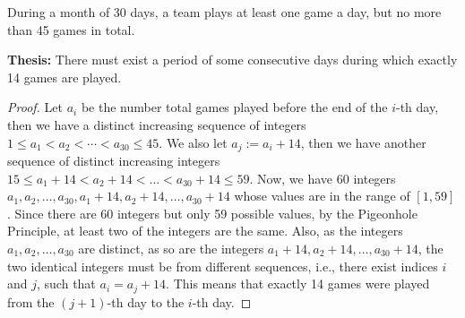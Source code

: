 \begin{example}
    During a month of 30 days, a team plays at least one game a day, but no more than 45 games in total.

    \textbf{Thesis:} There must exist a period of some consecutive days during which exactly 14 games are
    played.

    \begin{proof}
        Let $a_i$ be the number total games played before the end of the $i$-th day, then we have
        a distinct increasing sequence of integers $1\leq a_1<a_2<\cdots<a_{30}\leq 45$. We also let
        $a_j := a_i+14$, then we have another sequence of distinct increasing integers
        $15\leq a_1+14<a_2+14<\ldots<a_{30}+14\leq 59$. Now, we have 60 integers $a_1, a_2, \ldots, a_{30},
        a_1+14, a_2+14, \ldots, a_{30}+14$ whose values are in the range of $[1, 59]$. Since there are
        60 integers but only 59 possible values, by the Pigeonhole Principle, at least two of the integers
        are the same. Also, as the integers $a_1, a_2, \ldots, a_30$ are distinct, as so are the integers
        $a_1+14, a_2+14, \ldots, a_{30}+14$, the two identical integers must be from different sequences,
        i.e., there exist indices $i$ and $j$, such that $a_i = a_j + 14$. This means that exactly 14 games
        were played from the $(j+1)$-th day to the $i$-th day.
    \end{proof}
\end{example}